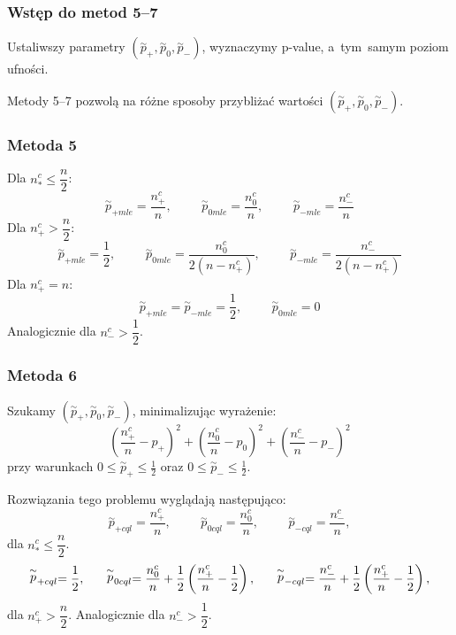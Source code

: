 \documentclass[11pt,usenames,dvipsnames,svgnames,x11names]{beamer}
\theoremstyle{plain}
\theoremstyle{definition}
\theoremstyle{remark}
\begin{document}
\begin{frame}
\frametitle{Wstęp do metod 5--7}
Ustaliwszy parametry $(\stackrel{\sim}{p}_+,\stackrel{\sim}{p}_0,\stackrel{\sim}{p}_-)$, wyznaczymy p-value, a~tym~samym poziom ufności.

\bigskip

Metody 5--7 pozwolą na różne sposoby przybliżać wartości $(\stackrel{\sim}{p}_+,\stackrel{\sim}{p}_0,\stackrel{\sim}{p}_-)$. 
\end{frame}

\begin{frame}
\frametitle{Metoda 5}
Dla $n_*^c \leq \dfrac{n}{2}$:
$$
\stackrel{\sim}{p}_{+mle} = \dfrac{n_+^c}{n},\hspace{1cm}\stackrel{\sim}{p}_{0mle} = \dfrac{n_0^c}{n},\hspace{1cm}\stackrel{\sim}{p}_{-mle} = \dfrac{n_-^c}{n}
$$
Dla $n_+^c > \dfrac{n}{2}$:
$$
\stackrel{\sim}{p}_{+mle} = \dfrac{1}{2},\hspace{1cm}\stackrel{\sim}{p}_{0mle} = \dfrac{n_0^c}{2(n-n^c_+)},\hspace{1cm}\stackrel{\sim}{p}_{-mle} = \dfrac{n_-^c}{2(n-n^c_+)}
$$
Dla $n_+^c = n$:
$$
\stackrel{\sim}{p}_{+mle} =\stackrel{\sim}{p}_{-mle} = \dfrac{1}{2},\hspace{1cm} \stackrel{\sim}{p}_{0mle}=0 
$$
Analogicznie dla $n_-^c> \dfrac{1}{2}$.
\end{frame}

\begin{frame}
\frametitle{Metoda 6}
Szukamy $(\stackrel{\sim}{p}_+,\stackrel{\sim}{p}_0,\stackrel{\sim}{p}_-)$, minimalizując wyrażenie:
$$
\left(\dfrac{n_+^c}{n}-p_+\right)^2 + \left(\dfrac{n_0^c}{n}-p_0\right)^2 + \left(\dfrac{n_-^c}{n}-p_-\right)^2
$$
przy warunkach $ 0 \leq  \stackrel{\sim}{p}_+ \leq \frac{1}{2}$ oraz $ 0 \leq  \stackrel{\sim}{p}_- \leq \frac{1}{2}$.

\bigskip

Rozwiązania tego problemu wyglądają następująco:
$$
\stackrel{\sim}{p}_{+cql} = \dfrac{n_+^c}{n},\hspace{1cm}\stackrel{\sim}{p}_{0cql} = \dfrac{n_0^c}{n},\hspace{1cm}\stackrel{\sim}{p}_{-cql} = \dfrac{n_-^c}{n},
$$
dla $n_*^c \leq \dfrac{n}{2}$.
$$
\stackrel{\sim}{p}_{+cql} = \dfrac{1}{2},\hspace{0.6cm}\stackrel{\sim}{p}_{0cql} = \dfrac{n_0^c}{n} + \dfrac{1}{2}\left( \dfrac{n_+^c}{n} - \dfrac{1}{2} \right),\hspace{0.6cm}\stackrel{\sim}{p}_{-cql} = \dfrac{n_-^c}{n} + \dfrac{1}{2}\left( \dfrac{n_+^c}{n} - \dfrac{1}{2} \right),
$$
dla $n_+^c > \dfrac{n}{2}$. Analogicznie dla $n_-^c> \dfrac{1}{2}$.
\end{frame}
\end{document}

